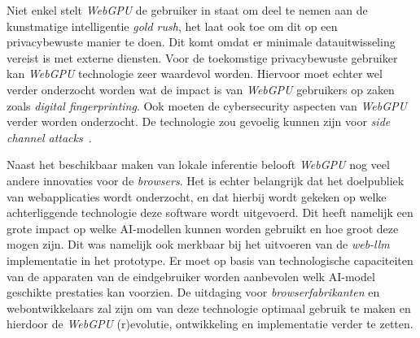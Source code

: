 \bigbreak{}

Niet enkel stelt \textit{WebGPU} de gebruiker in staat om deel te nemen aan de kunstmatige intelligentie \textit{gold rush}, het laat ook toe om dit op een privacybewuste manier te doen. Dit komt omdat er minimale datauitwisseling vereist is met externe diensten. Voor de toekomstige privacybewuste gebruiker kan \textit{WebGPU} technologie zeer waardevol worden. Hiervoor moet echter wel verder onderzocht worden wat de impact is van \textit{WebGPU} gebruikers op zaken zoals \textit{digital fingerprinting}. Ook moeten de cybersecurity aspecten van \textit{WebGPU} verder worden onderzocht. De technologie zou gevoelig kunnen zijn voor \textit{side channel attacks}~\autocite{Giner2024}.

\bigbreak{}

Naast het beschikbaar maken van lokale inferentie belooft \textit{WebGPU} nog veel andere innovaties voor de \textit{browsers}. Het is echter belangrijk dat het doelpubliek van webapplicaties wordt onderzocht, en dat hierbij wordt gekeken op welke achterliggende technologie deze software wordt uitgevoerd. Dit heeft namelijk een grote impact op welke AI-modellen kunnen worden gebruikt en hoe groot deze mogen zijn. Dit was namelijk ook merkbaar bij het uitvoeren van de \textit{web-llm} implementatie in het prototype. Er moet op basis van technologische capaciteiten van de apparaten van de eindgebruiker worden aanbevolen welk AI-model geschikte prestaties kan voorzien. De uitdaging voor \textit{browserfabrikanten} en web\-on\-twi\-kke\-laars zal zijn om van deze technologie optimaal gebruik te maken en hierdoor de \textit{WebGPU} (r)evolutie, ontwikkeling en implementatie verder te zetten.